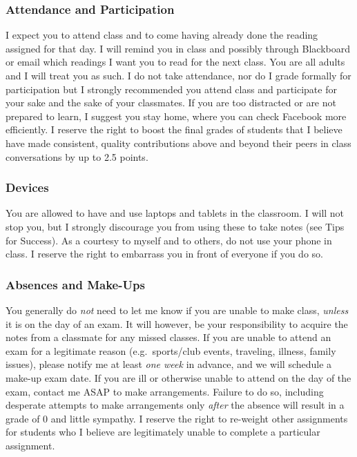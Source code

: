 \documentclass{article}
\begin{document}
\hypertarget{attendance-and-participation}{%
\subsubsection{Attendance and
Participation}\label{attendance-and-participation}}

I expect you to attend class and to come having already done the reading
assigned for that day. I will remind you in class and possibly through
Blackboard or email which readings I want you to read for the next
class. You are all adults and I will treat you as such. I do not take
attendance, nor do I grade formally for participation but I strongly
recommended you attend class and participate for your sake and the sake
of your classmates. If you are too distracted or are not prepared to
learn, I suggest you stay home, where you can check Facebook more
efficiently. I reserve the right to boost the final grades of students
that I believe have made consistent, quality contributions above and
beyond their peers in class conversations by up to 2.5 points.

\hypertarget{devices}{%
\subsubsection{Devices}\label{devices}}

You are allowed to have and use laptops and tablets in the classroom. I
will not stop you, but I strongly discourage you from using these to
take notes (see Tips for Success). As a courtesy to myself and to
others, do not use your phone in class. I reserve the right to embarrass
you in front of everyone if you do so.

\hypertarget{absences-and-make-ups}{%
\subsubsection{Absences and Make-Ups}\label{absences-and-make-ups}}

You generally do \emph{not} need to let me know if you are unable to
make class, \emph{unless} it is on the day of an exam. It will however,
be your responsibility to acquire the notes from a classmate for any
missed classes. If you are unable to attend an exam for a legitimate
reason (e.g.~sports/club events, traveling, illness, family issues),
please notify me at least \emph{one week} in advance, and we will
schedule a make-up exam date. If you are ill or otherwise unable to
attend on the day of the exam, contact me ASAP to make arrangements.
Failure to do so, including desperate attempts to make arrangements only
\emph{after} the absence will result in a grade of 0 and little
sympathy. I reserve the right to re-weight other assignments for
students who I believe are legitimately unable to complete a particular
assignment.
\end{document}
